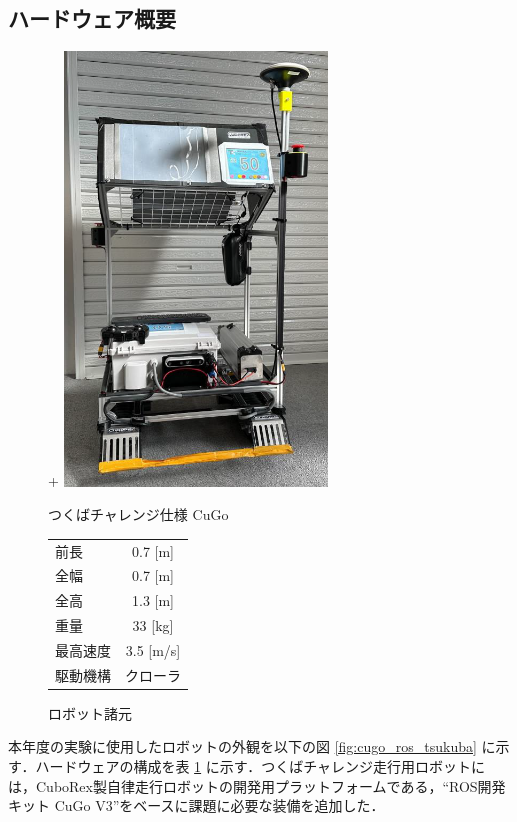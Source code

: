 \documentclass[platex,dvipdfmx]{rbproceedings}
\begin{document}
\subsection{ハードウェア概要}
\begin{figure}[htbp]
    \centering
    \begin{minipage}[b]{0.45\linewidth}
        \centering
+        \includegraphics[keepaspectratio,width=70mm]{fig/cugo_tsukuba.png}
        \caption{つくばチャレンジ仕様 CuGo}
        \label{fig:cugo_ros_tsukuba}
    \end{minipage}
    \begin{minipage}[b]{0.45\linewidth}
        \centering
        \caption{ロボット諸元}
        \label{tab:cugo_ros_tsukuba_spec}
        \begin{tabular}{lc}
            \hline
            前長     & 0.7 [m] \\
            全幅     & 0.7 [m] \\
            全高     & 1.3 [m] \\
            重量     & 33  [kg] \\
            最高速度 & 3.5 [m/s] \\
            駆動機構 & クローラ \\
            \hline
        \end{tabular}
    \end{minipage}
\end{figure}

本年度の実験に使用したロボットの外観を以下の図 \ref{fig:cugo_ros_tsukuba} に示す．ハードウェアの構成を表 \ref{tab:cugo_ros_tsukuba_spec} に示す．つくばチャレンジ走行用ロボットには，CuboRex製自律走行ロボットの開発用プラットフォームである，“ROS開発キット CuGo V3”をベースに課題に必要な装備を追加した．
\end{document}
